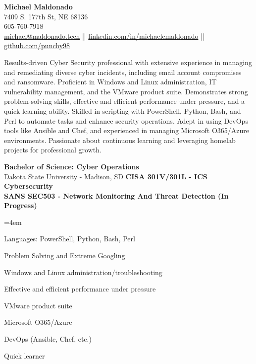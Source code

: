 \documentclass[a4paper,10pt]{article}
\begin{document}
\begin{center}
    \textbf{\LARGE Michael Maldonado} \\
    7409 S. 177th St, NE 68136 \\
    605-760-7918 \\
    \href{mailto:michael@maldonado.tech}{michael@maldonado.tech} ||
    \href{https://linkedin.com/in/michaelcmaldonado}{linkedin.com/in/michaelcmaldonado} ||
    \href{https://github.com/punchy98}{github.com/punchy98} 
\end{center}

Results-driven Cyber Security professional with extensive experience in managing and remediating diverse cyber incidents, including email account compromises and ransomware. Proficient in Windows and Linux administration, IT vulnerability management, and the VMware product suite. Demonstrates strong problem-solving skills, effective and efficient performance under pressure, and a quick learning ability. Skilled in scripting with PowerShell, Python, Bash, and Perl to automate tasks and enhance security operations. Adept in using DevOps tools like Ansible and Chef, and experienced in managing Microsoft O365/Azure environments. Passionate about continuous learning and leveraging homelab projects for professional growth.

\textbf{Bachelor of Science: Cyber Operations} \\
Dakota State University - Madison, SD 
\textbf{CISA 301V/301L - ICS Cybersecurity} \\
\textbf{SANS SEC503 - Network Monitoring And Threat Detection (In Progress)}
\begin{itemize}
    \begin{multicols}{2}
    \leftskip=4em
    \item Languages: PowerShell, Python, Bash, Perl
    \item Problem Solving and Extreme Googling
    \item Windows and Linux administration/troubleshooting
    \item Effective and efficient performance under pressure
    \item VMware product suite
    \item Microsoft O365/Azure
    \item DevOps (Ansible, Chef, etc.)
    \item Quick learner
    \end{multicols}
\end{itemize}
\end{document}
